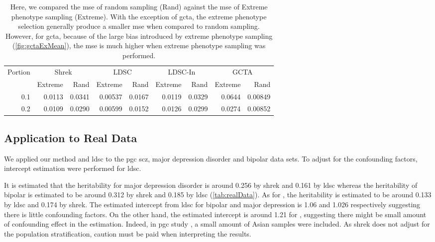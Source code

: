 		
		\begin{table}
			\centering
			\begin{tabular}{rrrrrrrrr}
				\toprule
				\multirow{2}[4]{*}{Portion} & \multicolumn{2}{c}{Shrek} & \multicolumn{2}{c}{LDSC} & \multicolumn{2}{c}{LDSC-In} & \multicolumn{2}{c}{GCTA} \\
				& Extreme & Rand & Extreme & Rand & Extreme & Rand & Extreme & Rand\\
				\midrule
				0.1   & 0.0113 & 0.0341 & 0.00537 & 0.0167 & 0.0119 & 0.0329 & 0.0644 & 0.00849 \\
				0.2   & 0.0109 & 0.0290 & 0.00599 & 0.0152 & 0.0126 & 0.0299 & 0.0274 & 0.00852 \\
				\bottomrule
			\end{tabular}
			\caption[Comparing the MSE of Extreme Phenotype Sampling and Random Sampling]{
				Here, we compared the \gls{mse} of random sampling (Rand) against the \gls{mse} of Extreme phenotype sampling (Extreme). 
				With the exception of \gls{gcta}, the extreme phenotype selection generally produce a smaller \gls{mse} when compared to random sampling. 
				However, for \gls{gcta}, because of the large bias introduced by extreme phenotype sampling (\cref{fig:gctaExMean}), the \gls{mse} is much higher when extreme phenotype sampling was performed.
			}
			\label{tab:ratioEx}
		\end{table}
		
		
		\subsection{Application to Real Data}
		We applied our method and \gls{ldsc} to the \gls{pgc} \gls{scz}, major depression disorder and bipolar data sets.
		To adjust for the confounding factors, intercept estimation were performed for \gls{ldsc}. 
		
		It is estimated that the heritability for major depression disorder is around 0.256 by \gls{shrek} and 0.161 by \gls{ldsc} whereas the heritability of bipolar is estimated to be around 0.312 by \gls{shrek} and 0.185 by \gls{ldsc} (\cref{tab:realData}).
		As for , the heritability is estimated to be around 0.133 by \gls{ldsc} and 0.174 by \gls{shrek}.
		The estimated intercept from \gls{ldsc} for bipolar and major depression is 1.06 and 1.026 respectively suggesting there is little confounding factors. 
		On the other hand, the estimated intercept is around 1.21 for , suggesting there might be small amount of confounding effect in the estimation.
		Indeed, in \gls{pgc}  study \citep{Ripke2014}, a small amount of Asian samples were included.
		As \gls{shrek} does not adjust for the population stratification, caution must be paid when interpreting the results.
		

